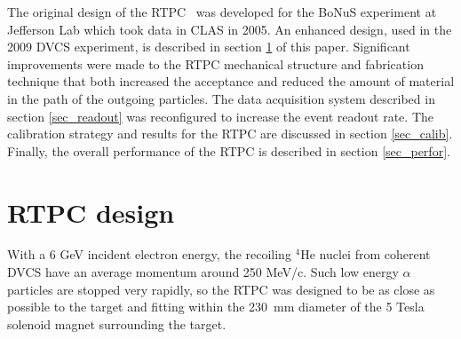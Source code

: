 \documentclass[preprint,5p]{elsarticle}
\begin{document}
The original design of the RTPC~\cite{BONUS-NIM} was developed for the BoNuS 
experiment at Jefferson Lab which took data in CLAS in 2005. An enhanced design, 
used in the 2009 DVCS experiment, is described in section \ref{sec_design} 
of this paper. Significant improvements were made to the RTPC mechanical 
structure and fabrication technique that both increased the acceptance and 
reduced the amount of material in the path of the outgoing particles. The 
data acquisition system described in section \ref{sec_readout} was reconfigured 
to increase the event readout rate. The calibration strategy and results for 
the RTPC are discussed in section \ref{sec_calib}. Finally, the overall performance
of the RTPC is described in section \ref{sec_perfor}.

\section{RTPC design} \label{sec_design}

With a 6 GeV incident electron energy, the recoiling $^{4}$He nuclei from coherent 
DVCS have an average momentum around 250 MeV/c. Such low energy $\alpha$ 
particles are stopped very rapidly, so the RTPC was designed to be as close 
as possible to the target and fitting within the 230~mm diameter 
of the 5 Tesla solenoid magnet surrounding the target. 
\end{document}
